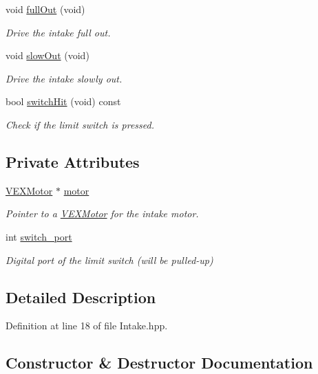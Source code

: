 \begin{DoxyCompactItemize}
void \hyperlink{class_intake_abd14de5ccd68929ea2627ca11aec9688}{full\+Out} (void)
\begin{DoxyCompactList}\small\item\em Drive the intake full out. \end{DoxyCompactList}\item 
void \hyperlink{class_intake_a1b3dccca0c1805d7930d7289a5636c09}{slow\+Out} (void)
\begin{DoxyCompactList}\small\item\em Drive the intake slowly out. \end{DoxyCompactList}\item 
bool \hyperlink{class_intake_ae9bf8ae8ebed0f1ba36443373eb0ae63}{switch\+Hit} (void) const
\begin{DoxyCompactList}\small\item\em Check if the limit switch is pressed. \end{DoxyCompactList}\end{DoxyCompactItemize}
\subsection*{Private Attributes}
\begin{DoxyCompactItemize}
\item 
\hyperlink{class_v_e_x_motor}{V\+E\+X\+Motor} $\ast$ \hyperlink{class_intake_abfffad571bacf945d6a2a121f59869fd}{motor}
\begin{DoxyCompactList}\small\item\em Pointer to a \hyperlink{class_v_e_x_motor}{V\+E\+X\+Motor} for the intake motor. \end{DoxyCompactList}\item 
int \hyperlink{class_intake_aa42c4826bb88549c29ff88a355765787}{switch\+\_\+port}
\begin{DoxyCompactList}\small\item\em Digital port of the limit switch (will be pulled-\/up) \end{DoxyCompactList}\end{DoxyCompactItemize}


\subsection{Detailed Description}


Definition at line 18 of file Intake.\+hpp.



\subsection{Constructor \& Destructor Documentation}
\mbox{\label{class_intake_a2e46d55447100225183045b3ba9677a1}} 
